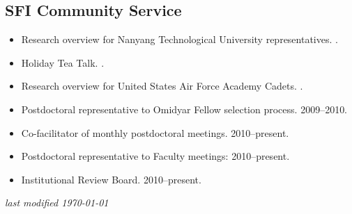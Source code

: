 \documentclass[overlapped,line]{res}
\begin{document}
\begin{resume}

\section{\bf \large SFI Community Service}
\begin{itemize}[$\ast$]
\item Research overview for Nanyang Technological University representatives. .
\item Holiday Tea Talk. .
\item Research overview for United States Air Force Academy Cadets. .
\item Postdoctoral representative to Omidyar Fellow selection process. 2009--2010.
\item Co-facilitator of monthly postdoctoral meetings. 2010--present.
\item Postdoctoral representative to Faculty meetings: 2010--present.
\item Institutional Review Board. 2010--present.
\end{itemize}


\begin{center} 
\vspace{\fill}
\small \it last modified \today
\end{center}

\end{resume}
\end{document}
